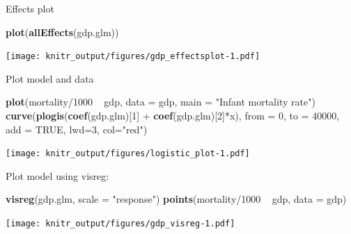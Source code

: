 \documentclass[10pt,ignorenonframetext,]{beamer}
\newenvironment{Shaded}{\begin{snugshade}}{\end{snugshade}}
\newcommand{\KeywordTok}[1]{\textcolor[rgb]{0.13,0.29,0.53}{\textbf{{#1}}}}
\newcommand{\DataTypeTok}[1]{\textcolor[rgb]{0.13,0.29,0.53}{{#1}}}
\newcommand{\DecValTok}[1]{\textcolor[rgb]{0.00,0.00,0.81}{{#1}}}
\newcommand{\StringTok}[1]{\textcolor[rgb]{0.31,0.60,0.02}{{#1}}}
\newcommand{\OtherTok}[1]{\textcolor[rgb]{0.56,0.35,0.01}{{#1}}}
\newcommand{\NormalTok}[1]{{#1}}
\begin{document}
\begin{frame}[fragile]{Effects plot}

\begin{Shaded}
\begin{Highlighting}[]
\KeywordTok{plot}\NormalTok{(}\KeywordTok{allEffects}\NormalTok{(gdp.glm))}
\end{Highlighting}
\end{Shaded}

\texttt{[image: knitr\_output/figures/gdp\_effectsplot-1.pdf]}

\end{frame}

\begin{frame}[fragile]{Plot model and data}

\begin{Shaded}
\begin{Highlighting}[]
\KeywordTok{plot}\NormalTok{(mortality/}\DecValTok{1000} \NormalTok{~}\StringTok{ }\NormalTok{gdp, }\DataTypeTok{data =} \NormalTok{gdp, }\DataTypeTok{main =} \StringTok{"Infant mortality rate"}\NormalTok{)}
\KeywordTok{curve}\NormalTok{(}\KeywordTok{plogis}\NormalTok{(}\KeywordTok{coef}\NormalTok{(gdp.glm)[}\DecValTok{1}\NormalTok{] +}\StringTok{ }\KeywordTok{coef}\NormalTok{(gdp.glm)[}\DecValTok{2}\NormalTok{]*x), }\DataTypeTok{from =} \DecValTok{0}\NormalTok{, }\DataTypeTok{to =} \DecValTok{40000}\NormalTok{, }\DataTypeTok{add =} \OtherTok{TRUE}\NormalTok{, }\DataTypeTok{lwd=}\DecValTok{3}\NormalTok{, }\DataTypeTok{col=}\StringTok{"red"}\NormalTok{)}
\end{Highlighting}
\end{Shaded}

\texttt{[image: knitr\_output/figures/logistic\_plot-1.pdf]}

\end{frame}

\begin{frame}[fragile]{Plot model using visreg:}

\begin{Shaded}
\begin{Highlighting}[]
\KeywordTok{visreg}\NormalTok{(gdp.glm, }\DataTypeTok{scale =} \StringTok{"response"}\NormalTok{)}
\KeywordTok{points}\NormalTok{(mortality/}\DecValTok{1000} \NormalTok{~}\StringTok{ }\NormalTok{gdp, }\DataTypeTok{data =} \NormalTok{gdp)}
\end{Highlighting}
\end{Shaded}

\texttt{[image: knitr\_output/figures/gdp\_visreg-1.pdf]}

\end{frame}
\end{document}
